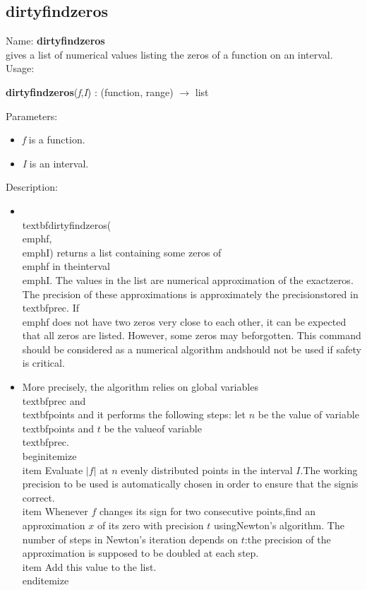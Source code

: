 \subsection{dirtyfindzeros}
\label{labdirtyfindzeros}
\noindent Name: \textbf{dirtyfindzeros}\\
gives a list of numerical values listing the zeros of a function on an interval.\\
\noindent Usage: 
\begin{center}
\textbf{dirtyfindzeros}(\emph{f},\emph{I}) : (\textsf{function}, \textsf{range}) $\rightarrow$ \textsf{list}\\
\end{center}
Parameters: 
\begin{itemize}
\item \emph{f} is a function.
\item \emph{I} is an interval.
\end{itemize}
\noindent Description: \begin{itemize}

\item \\textbf{dirtyfindzeros}(\\emph{f},\\emph{I}) returns a list containing some zeros of \\emph{f} in the\n   interval \\emph{I}. The values in the list are numerical approximation of the exact\n   zeros. The precision of these approximations is approximately the precision\n   stored in \\textbf{prec}. If \\emph{f} does not have two zeros very close to each other, it \n   can be expected that all zeros are listed. However, some zeros may be\n   forgotten. This command should be considered as a numerical algorithm and\n   should not be used if safety is critical.\n
\item More precisely, the algorithm relies on global variables \\textbf{prec} and \\textbf{points} and it performs the following steps: \n   let $n$ be the value of variable \\textbf{points} and $t$ be the value\n   of variable \\textbf{prec}.\n   \\begin{itemize}\n   \\item Evaluate $|f|$ at $n$ evenly distributed points in the interval $I$.\n     The working precision to be used is automatically chosen in order to ensure that the sign\n     is correct.\n   \\item Whenever $f$ changes its sign for two consecutive points,\n     find an approximation $x$ of its zero with precision $t$ using\n     Newton's algorithm. The number of steps in Newton's iteration depends on $t$:\n     the precision of the approximation is supposed to be doubled at each step.\n   \\item Add this value to the list.\n   \\end{itemize}\n\end{itemize}
